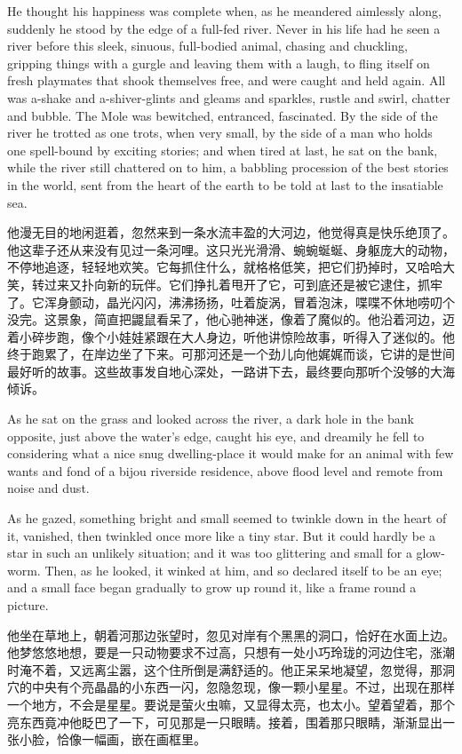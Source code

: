 {  	He thought his happiness was complete when, as he meandered aimlessly along, suddenly he stood by the edge of a full-fed river. Never in his life had he seen a river before this sleek, sinuous, full-bodied animal, chasing and chuckling, gripping things with a gurgle and leaving them with a laugh, to fling itself on fresh playmates that shook themselves free, and were caught and held again. All was a-shake and a-shiver-glints and gleams and sparkles, rustle and swirl, chatter and bubble. The Mole was bewitched, entranced, fascinated. By the side of the river he trotted as one trots, when very small, by the side of a man who holds one spell-bound by exciting stories; and when tired at last, he sat on the bank, while the river still chattered on to him, a babbling procession of the best stories in the world, sent from the heart of the earth to be told at last to the insatiable sea.
  	
  	他漫无目的地闲逛着，忽然来到一条水流丰盈的大河边，他觉得真是快乐绝顶了。他这辈子还从来没有见过一条河哩。这只光光滑滑、蜿蜿蜒蜒、身躯庞大的动物，不停地追逐，轻轻地欢笑。它每抓住什么，就格格低笑，把它们扔掉时，又哈哈大笑，转过来又扑向新的玩伴。它们挣扎着甩开了它，可到底还是被它逮住，抓牢了。它浑身颤动，晶光闪闪，沸沸扬扬，吐着旋涡，冒着泡沫，喋喋不休地唠叨个没完。这景象，简直把鼹鼠看呆了，他心驰神迷，像着了魔似的。他沿着河边，迈着小碎步跑，像个小娃娃紧跟在大人身边，听他讲惊险故事，听得入了迷似的。他终于跑累了，在岸边坐了下来。可那河还是一个劲儿向他娓娓而谈，它讲的是世间最好听的故事。这些故事发自地心深处，一路讲下去，最终要向那听个没够的大海倾诉。
  	
  	
  	As he sat on the grass and looked across the river, a dark hole in the bank opposite, just above the water's edge, caught his eye, and dreamily he fell to considering what a nice snug dwelling-place it would make for an animal with few wants and fond of a bijou riverside residence, above flood level and remote from noise and dust.
  	
  	As he gazed, something bright and small seemed to twinkle down in the heart of it, vanished, then twinkled once more like a tiny star. But it could hardly be a star in such an unlikely situation; and it was too glittering and small for a glow-worm. Then, as he looked, it winked at him, and so declared itself to be an eye; and a small face began gradually to grow up round it, like a frame round a picture.
  	
  	他坐在草地上，朝着河那边张望时，忽见对岸有个黑黑的洞口，恰好在水面上边。他梦悠悠地想，要是一只动物要求不过高，只想有一处小巧玲珑的河边住宅，涨潮时淹不着，又远离尘嚣，这个住所倒是满舒适的。他正呆呆地凝望，忽觉得，那洞穴的中央有个亮晶晶的小东西一闪，忽隐忽现，像一颗小星星。不过，出现在那样一个地方，不会是星星。要说是萤火虫嘛，又显得太亮，也太小。望着望着，那个亮东西竟冲他眨巴了一下，可见那是一只眼睛。接着，围着那只眼睛，渐渐显出一张小脸，恰像一幅画，嵌在画框里。
  	
}
